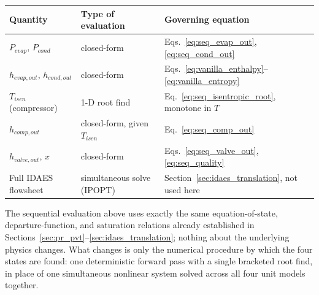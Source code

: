 \documentclass{article}
\begin{document}
\begin{center}
\begin{tabular}{lll}
\textbf{Quantity} & \textbf{Type of evaluation} & \textbf{Governing equation} \\
\hline
$P_{evap}$, $P_{cond}$ & closed-form & Eqs.~\eqref{eq:seq_evap_out}, \eqref{eq:seq_cond_out} \\
$h_{evap,out}$, $h_{cond,out}$ & closed-form & Eqs.~\eqref{eq:vanilla_enthalpy}--\eqref{eq:vanilla_entropy} \\
$T_{isen}$ (compressor) & 1-D root find & Eq.~\eqref{eq:seq_isentropic_root}, monotone in $T$ \\
$h_{comp,out}$ & closed-form, given $T_{isen}$ & Eq.~\eqref{eq:seq_comp_out} \\
$h_{valve,out}$, $x$ & closed-form & Eqs.~\eqref{eq:seq_valve_out}, \eqref{eq:seq_quality} \\
\hline
Full IDAES flowsheet & simultaneous solve (IPOPT) & Section~\ref{sec:idaes_translation}, not used here \\
\end{tabular}
\end{center}

The sequential evaluation above uses exactly the same equation-of-state,
departure-function, and saturation relations already established in
Sections~\ref{sec:pr_pvt}--\ref{sec:idaes_translation}; nothing about the
underlying physics changes. What changes is only the numerical procedure
by which the four states are found: one deterministic forward pass with a
single bracketed root find, in place of one simultaneous nonlinear system
solved across all four unit models together.



\end{document}
